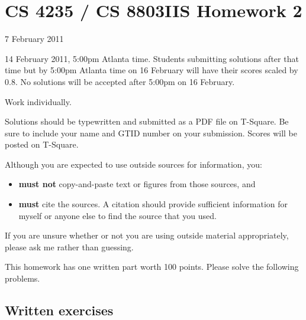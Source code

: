 \documentclass[letterpaper]{article}
\title{}
\date{}
\begin{document}
\thispagestyle{empty}

\section*{CS 4235 / CS 8803IIS Homework 2}

 7 February 2011

 14 February 2011, 5:00pm Atlanta time. Students submitting solutions after that time but by 5:00pm Atlanta time on 16 February will have their scores scaled by 0.8. No solutions will be accepted after 5:00pm on 16 February.

 Work individually.

\bigskip\noindent
Solutions should be typewritten and submitted as a PDF file on T-Square. Be sure to include your name and GTID number on your submission. Scores will be posted on T-Square.

\bigskip\noindent
Although you are expected to use outside sources for information, you:
\begin{itemize}
\item {\bf must not} copy-and-paste text or figures from those sources, and
\item {\bf must} cite the sources. A citation should provide sufficient information for myself or anyone else to find the source that you used.
\end{itemize}
If you are unsure whether or not you are using outside material appropriately, please ask me rather than guessing.

This homework has one written part worth 100 points. Please solve the following problems.

\subsection*{Written exercises}
\end{document}
